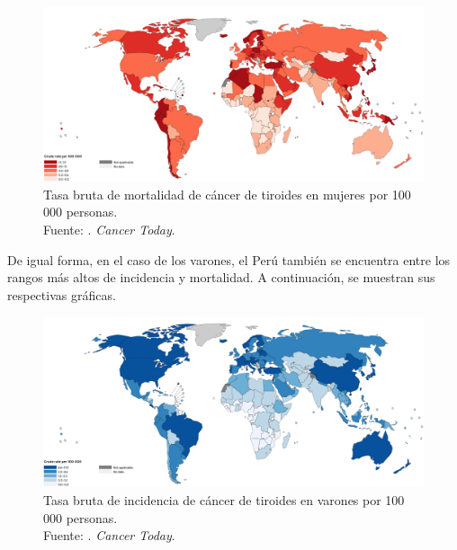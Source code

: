 \begin{figure}[H]
	\begin{center}
		\includegraphics[width=1.00 \textwidth]{1/figures/tb_mor_ct_mujeres.png}
		\caption[Tasa bruta de mortalidad de cáncer de tiroides en mujeres por 100 000 personas]{Tasa bruta de mortalidad de cáncer de tiroides en mujeres por 100 000 personas. \\
		Fuente: \cite{ws_oms2022cancert}. \textit{Cancer Today}.}
		\label{1:fig2}
	\end{center}
\end{figure}

De igual forma, en el caso de los varones, el Perú también se encuentra entre los rangos más altos de incidencia y mortalidad. A continuación, se muestran sus respectivas gráficas.

\begin{figure}[H]
	\begin{center}
		\includegraphics[width=1.00 \textwidth]{1/figures/tb_inc_ct_varones.png}
		\caption[Tasa bruta de incidencia de cáncer de tiroides en varones por 100 000 personas]{Tasa bruta de incidencia de cáncer de tiroides en varones por 100 000 personas. \\
		Fuente: \cite{ws_oms2022cancert}. \textit{Cancer Today}.}
		\label{1:fig3}
	\end{center}
\end{figure}

